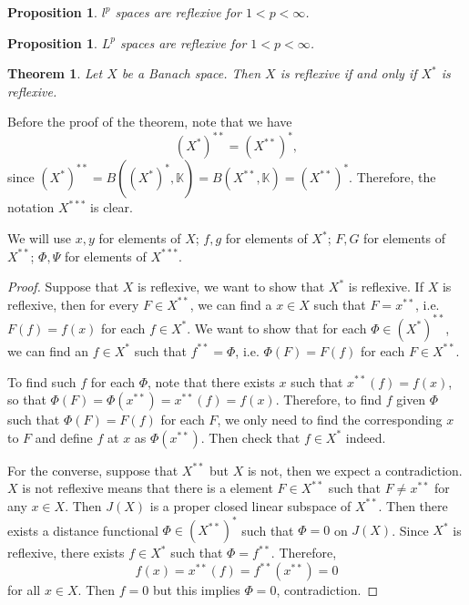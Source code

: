 \documentclass[12pt,a4paper]{report}
\numberwithin{equation}{section}
\theoremstyle{mystyle}
\newtheorem{theorem}[definition]{Theorem}
\newtheorem{proposition}[definition]{Proposition}
\newcommand{\K}{\mathbb{K}}
\begin{document}
	\begin{proposition}
		$l^p$ spaces are reflexive for $1<p<\infty$.
	\end{proposition}
	
	\begin{proposition}
		$L^p$ spaces are reflexive for $1<p<\infty$.
	\end{proposition}
	
	\begin{theorem}
		Let $X$ be a Banach space. Then $X$ is reflexive if and only if $X^*$ is reflexive.
	\end{theorem}

	Before the proof of the theorem, note that we have
	\begin{equation}
		(X^{*})^{**}=(X^{**})^{*},
	\end{equation}
	since $(X^{*})^{**}=B((X^{*})^*,\K)=B(X^{**},\K)=(X^{**})^{*}$. Therefore, the notation $X^{***}$ is clear. 
	
	We will use $x,y$ for elements of $X$; $f,g$ for elements of $X^*$; $F,G$ for elements of $X^{**}$; $\Phi,\Psi$ for elements of $X^{***}$.
	
	\begin{proof}
		Suppose that $X$ is reflexive, we want to show that $X^*$ is reflexive. If $X$ is reflexive, then for every $F\in X^{**}$, we can find a $x\in X$ such that $F=x^{**}$, i.e. $F(f)=f(x)$ for each $f\in X^*$. We want to show that for each $\Phi\in (X^{*})^{**}$, we can find an $f\in X^*$ such that $f^{**}=\Phi$, i.e. $\Phi(F)=F(f)$ for each $F\in X^{**}$. 
		
		To find such $f$ for each $\Phi$, note that there exists $x$ such that $x^{**}(f)=f(x)$, so that $\Phi(F)=\Phi(x^{**})=x^{**}(f)=f(x)$. Therefore, to find $f$ given $\Phi$ such that $\Phi(F)=F(f)$ for each $F$, we only need to find the corresponding $x$ to $F$ and define $f$ at $x$ as $\Phi(x^{**})$. Then check that $f\in X^{*}$ indeed.
		
		For the converse, suppose that $X^{**}$ but $X$ is not, then we expect a contradiction. $X$ is not reflexive means that there is a element $F\in X^{**}$ such that $F\neq x^{**}$ for any $x\in X$. Then $J(X)$ is a proper closed linear subspace of $X^{**}$. Then there exists a distance functional $\Phi\in (X^{**})^*$ such that $\Phi=0$ on $J(X)$. Since $X^{*}$ is reflexive, there exists $f\in X^*$ such that $\Phi=f^{**}$. Therefore,
		$$
		f(x)=x^{**}(f)=f^{**}(x^{**})=0
		$$
		for all $x\in X$. Then $f=0$ but this implies $\Phi=0$, contradiction.
	\end{proof}
	
\end{document}
